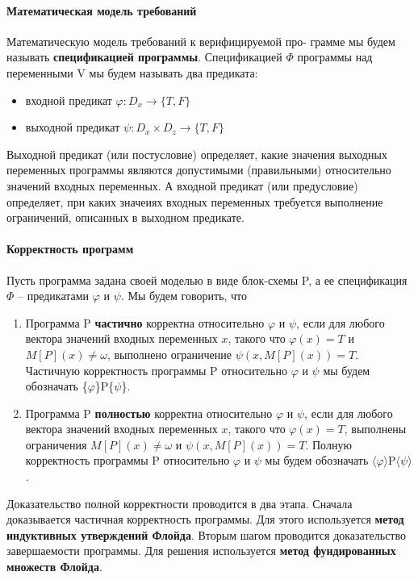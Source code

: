 \paragraph{Математическая модель требований}
Математическую модель требований к верифицируемой про- грамме мы будем называть \textbf{спецификацией программы}. Спецификацией $\Phi$ программы над переменными V мы будем называть два предиката:
\begin{itemize}
    \item входной предикат $\varphi: D_x \rightarrow \{ T, F \}$
    \item выходной предикат $\psi: D_x \times D_z \rightarrow \{T, F\}$
\end{itemize}
Выходной предикат (или постусловие) определяет, какие значения выходных переменных программы являются допустимыми (правильными) относительно значений входных переменных. А входной предикат (или предусловие) определяет, при каких значеиях входных переменных требуется выполнение ограничений, описанных в выходном предикате.
\paragraph{Корректность программ}
Пусть программа задана своей моделью в виде блок-схемы P, а ее спецификация $\Phi$ – предикатами $\varphi$ и $\psi$. Мы будем говорить, что
\begin{enumerate}
    \item Программа P \textbf{частично} корректна относительно $\varphi$ и $\psi$, если для любого вектора значений входных переменных $x$, такого что  $\varphi(x) = T$ и $M[P](x) \neq \omega$, выполнено ограничение $\psi(x, M[P] (x)) = T$. Частичную корректность программы P относительно $\varphi$ и $\psi$ мы будем обозначать \{$\varphi$\}P\{$\psi$\}.
    \item Программа P \textbf{полностью} корректна относительно $\varphi$ и $\psi$, если для любого вектора значений входных переменных $x$, такого что $\varphi(x) = T$, выполнены ограничения $M[P](x) \neq \omega$ и $\psi(x, M[P] (x)) = T$. Полную корректность программы P относительно $\varphi$ и $\psi$ мы будем обозначать $\langle\varphi\rangle$P$\langle\psi\rangle$.

\end{enumerate}

Доказательство полной корректности проводится в два этапа. Сначала доказывается частичная корректность программы. Для этого используется \textbf{метод индуктивных утверждений Флойда}. Вторым шагом проводится доказательство завершаемости программы. Для решения используется \textbf{метод фундированных множеств Флойда}.

